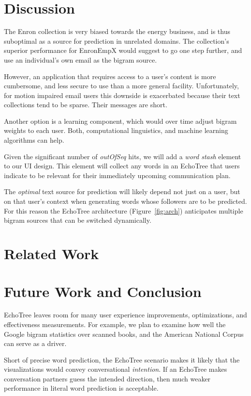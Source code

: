 \documentclass{sigchi}
\begin{document}
\section{Discussion}
The Enron collection is very biased towards the energy business, and
is thus suboptimal as a source for prediction in unrelated
domains. The collection's superior performance for EnronEmpX would
suggest to go one step further, and use an individual's own email as
the bigram source. 

However, an application that requires access to a user's content is
more cumbersome, and less secure to use than a more general facility.
Unfortunately, for motion impaired email users this downside is
exacerbated because their text collections tend to be sparse.
Their messages are short.

Another option is a learning component, which would over time adjust
bigram weights to each user. Both, computational linguistics, and
machine learning algorithms can help.

Given the significant number of {\em outOfSeq} hits, we will add
a {\em word stash} element to our UI design. This element will collect
any words in an EchoTree that users indicate to be relevant for their
immediately upcoming communication plan.

The {\em optimal} text source for prediction will likely depend not just on
a user, but on that user's context when generating words whose
followers are to be predicted. For this reason the EchoTree
architecture (Figure~\ref{fig:arch}) anticipates multiple bigram
sources that can be switched dynamically.

\section{Related Work}

\section{Future Work and Conclusion}
EchoTree leaves room for many user experience improvements,
optimizations, and effectiveness measurements. For example, we plan to
examine how well the Google bigram statistics over scanned books, and
the American National Corpus \cite{anc} can serve as a driver.

Short of precise word prediction, the EchoTree scenario makes it
likely that the visualizations would convey conversational {\em
  intention}. If an EchoTree makes conversation partners guess the
intended direction, then much weaker performance in literal word
prediction is acceptable.
\end{document}
